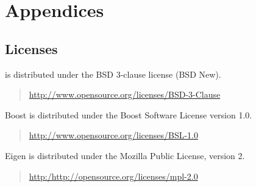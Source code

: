 \chapter{Appendices}

\section{Licenses}

\nomad is distributed under the BSD 3-clause license (BSD New).
%
\begin{quote}
\url{http://www.opensource.org/licenses/BSD-3-Clause}
\end{quote}

Boost is distributed under the Boost Software
License version 1.0.
%
\begin{quote}
\url{http://www.opensource.org/licenses/BSL-1.0}
\end{quote}

Eigen is distributed under the Mozilla Public License,
version 2.
%
\begin{quote}
\url{http:/http://opensource.org/licenses/mpl-2.0}
\end{quote}

